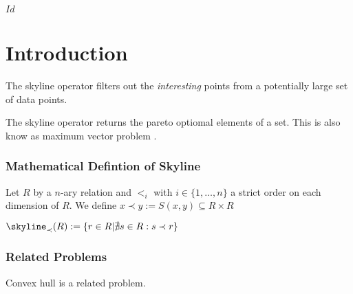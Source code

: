 
\svnInfo $Id$

\chapter{Introduction\revision}
\label{chap:Introduction}


The skyline operator \citep{Borzsonyi2001} filters out the \emph{interesting} points from a potentially large set of data points.


The skyline operator returns the pareto optiomal elements of a set. This is also know as maximum vector problem \citep{Borzsonyi2001}.


\subsection{Mathematical Defintion of Skyline}

Let $R$ by a $n$-ary relation and $<_i$ with $i \in \{1, \ldots, n\}$
a strict order on each dimension of $R$.
We define $x \prec y := S(x, y) \subseteq R \times R$

$\skyline_\prec(R) := \{ r \in R | \nexists s \in R : s \prec r \}$

\subsection{Related Problems}
Convex hull is a related problem.

